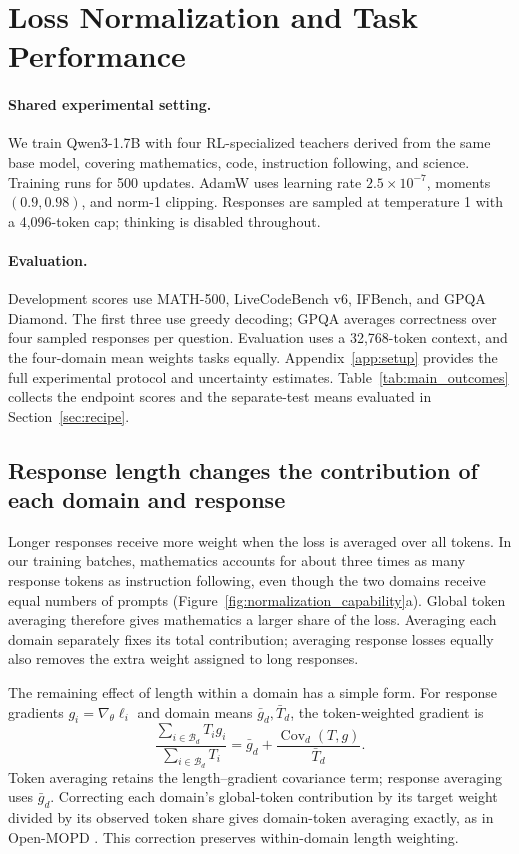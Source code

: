 \section{Loss Normalization and Task Performance}
\label{sec:normalization}

\paragraph{Shared experimental setting.}
We train Qwen3-1.7B with four RL-specialized teachers derived from the same base model, covering mathematics, code, instruction following, and science. Training runs for 500 updates. AdamW uses learning rate $2.5\times10^{-7}$, moments $(0.9,0.98)$, and norm-1 clipping. Responses are sampled at temperature 1 with a 4,096-token cap; thinking is disabled throughout.

\paragraph{Evaluation.}
Development scores use MATH-500, LiveCodeBench v6, IFBench, and GPQA Diamond. The first three use greedy decoding; GPQA averages correctness over four sampled responses per question. Evaluation uses a 32,768-token context, and the four-domain mean weights tasks equally. Appendix~\ref{app:setup} provides the full experimental protocol and uncertainty estimates. Table~\ref{tab:main_outcomes} collects the endpoint scores and the separate-test means evaluated in Section~\ref{sec:recipe}.



\subsection{Response length changes the contribution of each domain and response}

Longer responses receive more weight when the loss is averaged over all tokens. In our training batches, mathematics accounts for about three times as many response tokens as instruction following, even though the two domains receive equal numbers of prompts (Figure~\ref{fig:normalization_capability}a). Global token averaging therefore gives mathematics a larger share of the loss. Averaging each domain separately fixes its total contribution; averaging response losses equally also removes the extra weight assigned to long responses.

The remaining effect of length within a domain has a simple form. For response gradients $g_i=\nabla_\theta\ell_i$ and domain means $\bar g_d,\bar T_d$, the token-weighted gradient is
\begin{equation}
\frac{\sum_{i\in\mathcal B_d}T_i g_i}{\sum_{i\in\mathcal B_d}T_i}
=\bar g_d+\frac{\operatorname{Cov}_d(T,g)}{\bar T_d}.
\label{eq:weighting}
\end{equation}
Token averaging retains the length--gradient covariance term; response averaging uses $\bar g_d$. Correcting each domain's global-token contribution by its target weight divided by its observed token share gives domain-token averaging exactly, as in Open-MOPD \citep{gao2026openmopddiagnosingfixingcapability}. This correction preserves within-domain length weighting.


